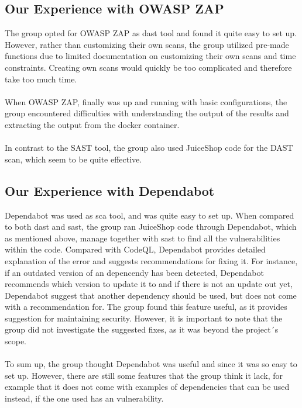 \subsection{Our Experience with OWASP ZAP}

The group opted for OWASP ZAP as \acrshort{dast} tool and found it quite easy to set up. However, rather than customizing their own scans, the group utilized pre-made functions due to limited documentation on customizing their own scans and time constraints. Creating own scans would quickly be too complicated and therefore take too much time. 
\\~\\
When OWASP ZAP, finally was up and running with basic configurations, the group encountered difficulties with understanding the output of the results and extracting the output from the docker container. 
\\~\\
In contrast to the SAST tool, the group also used JuiceShop code for the  DAST scan, which seem to be quite effective. 



\subsection{Our Experience with Dependabot}
Dependabot was used as \acrshort{sca} tool, and was quite easy to set up. When compared to both \acrshort{dast} and \acrshort{sast}, the group ran JuiceShop code through Dependabot, which as mentioned above, manage together with \acrshort{sast} to find all the vulnerabilities within the code. 
Compared with CodeQL, Dependabot provides detailed explanation of the error and suggests recommendations for fixing it. For instance, if an outdated version of an depencendy has been detected, Dependabot recommends which version to update it to and if there is not an update out yet, Dependabot suggest that another dependency should be used, but does not come with a recommendation for.  The group found this feature useful, as it provides suggestion for maintaining security. However, it is important to note that the group did not investigate the suggested fixes, as it was beyond the project´s scope.
\\~\\
To sum up, the group thought Dependabot was useful and since it was so easy to set up. However, there are still some features that the group think it lack, for example that it does not come with examples of dependencies that can be used instead, if the one used has an vulnerability. 

